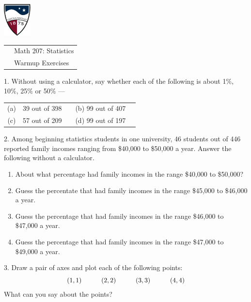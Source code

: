 \documentclass[10pt]{article}
\begin{document}

\vfill

\href{http://www.su.edu}{\includegraphics[height=1.75cm]{sulogo.eps}}
\vspace{-1.69cm}

{\small
\begin{tabular}{cl}
\hspace{5in} & Math 207:  Statistics\\
                & Warmup Exercises\\
\end{tabular}
}

\setlength{\baselineskip}{1.05\baselineskip}
\bigskip

1.  Without using a calculator, 
say whether each of the following is about 1\%, 10\%, 25\% or 50\% ---
\begin{center}
\begin{tabular}{clccl}
(a) & 39 out of 398 & \hspace{2in}  & (b) 99 out of 407\\[10pt]
(c) & 57 out of 209 &               & (d) 99 out of 197
\end{tabular}
\end{center}

2. Among beginning statistics students in one university, 46 students
out of 446 reported family incomes ranging from \$40,000 to \$50,000 a year.
Answer the following without a calculator.
\begin{enumerate}
\item[(a)] About what percentage had family incomes in the range \$40,000 
  to \$50,000?
\item[(b)] Guess the percentate that had family incomes in the range \$45,000 to \$46,000
   a year.
\item[(c)] Guess the percentage that had family incomes in the range \$46,000 to
   \$47,000 a year.
\item[(d)] Guess the percentage that had family incomes in the range \$47,000 to
   \$49,000 a year.
\end{enumerate}

3. Draw a pair of axes and plot each of the following points:
\[(1,1)\hspace{30pt} (2,2)\hspace{30pt} (3,3)\hspace{30pt} (4,4)\]
What can you say about the points?
\end{document}
